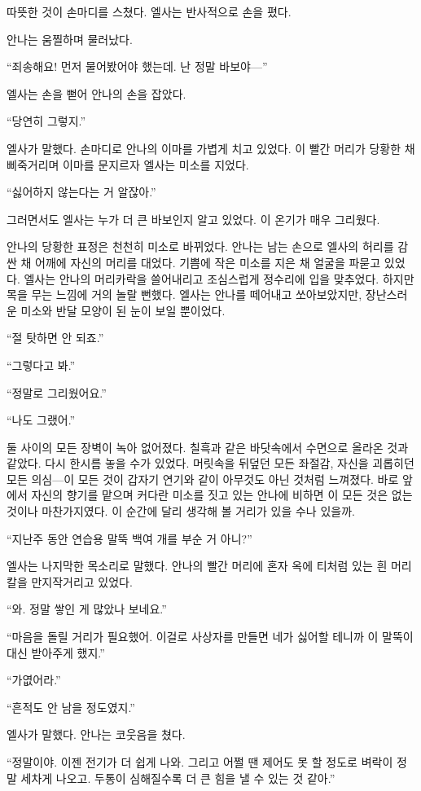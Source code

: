 따뜻한 것이 손마디를 스쳤다. 엘사는 반사적으로 손을 폈다.

안나는 움찔하며 물러났다.

``죄송해요! 먼저 물어봤어야 했는데. 난 정말 바보야—''

엘사는 손을 뻗어 안나의 손을 잡았다.

``당연히 그렇지.''

엘사가 말했다. 손마디로 안나의 이마를 가볍게 치고 있었다. 이 빨간 머리가 당황한 채 삐죽거리며 이마를 문지르자 엘사는 미소를 지었다.

``싫어하지 않는다는 거 알잖아.''

그러면서도 엘사는 누가 더 큰 바보인지 알고 있었다. 이 온기가 매우 그리웠다.

안나의 당황한 표정은 천천히 미소로 바뀌었다. 안나는 남는 손으로 엘사의 허리를 감싼 채 어깨에 자신의 머리를 대었다. 기쁨에 작은 미소를 지은 채 얼굴을 파묻고 있었다. 엘사는 안나의 머리카락을 쓸어내리고 조심스럽게 정수리에 입을 맞추었다. 하지만 목을 무는 느낌에 거의 놀랄 뻔했다. 엘사는 안나를 떼어내고 쏘아보았지만, 장난스러운 미소와 반달 모양이 된 눈이 보일 뿐이었다.

``절 탓하면 안 되죠.''

``그렇다고 봐.''

``정말로 그리웠어요.''

``나도 그랬어.''

둘 사이의 모든 장벽이 녹아 없어졌다. 칠흑과 같은 바닷속에서 수면으로 올라온 것과 같았다. 다시 한시름 놓을 수가 있었다. 머릿속을 뒤덮던 모든 좌절감, 자신을 괴롭히던 모든 의심—이 모든 것이 갑자기 연기와 같이 아무것도 아닌 것처럼 느껴졌다. 바로 앞에서 자신의 향기를 맡으며 커다란 미소를 짓고 있는 안나에 비하면 이 모든 것은 없는 것이나 마찬가지였다. 이 순간에 달리 생각해 볼 거리가 있을 수나 있을까.

``지난주 동안 연습용 말뚝 백여 개를 부순 거 아니?''

엘사는 나지막한 목소리로 말했다. 안나의 빨간 머리에 혼자 옥에 티처럼 있는 흰 머리칼을 만지작거리고 있었다.

``와. 정말 쌓인 게 많았나 보네요.''

``마음을 돌릴 거리가 필요했어. 이걸로 사상자를 만들면 네가 싫어할 테니까 이 말뚝이 대신 받아주게 했지.''

``가엾어라.''

``흔적도 안 남을 정도였지.''

엘사가 말했다. 안나는 코웃음을 쳤다.

``정말이야. 이젠 전기가 더 쉽게 나와. 그리고 어쩔 땐 제어도 못 할 정도로 벼락이 정말 세차게 나오고. 두통이 심해질수록 더 큰 힘을 낼 수 있는 것 같아.''

